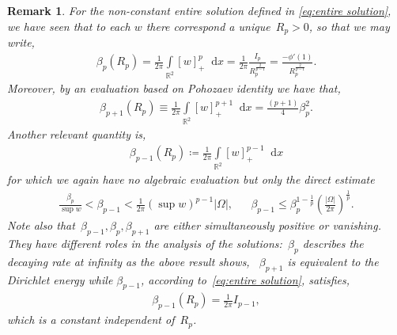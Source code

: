 \documentclass[10pt]{amsart}
\newcommand{\parenthesis}[1]{\left(#1\right)} %
\newcommand{\R}{\mathbb{R}}
\newcommand{\dd}{\mathop{}\!\mathrm{d}}
\def\R{\mathbb{R}}
\newtheorem{remark}[theorem]{Remark}
\begin{document}
\bigskip

    \begin{remark}
        For the non-constant entire solution defined in \eqref{eq:entire solution}, we have seen that to each $w$ there correspond a
        unique~$R_p>0$, so that we may write,
        \begin{align*}
            \beta_p(R_p)= \frac{1}{2\pi}\int\limits_{\R^2} [w]_+^p\dd{x}
            =\frac{1}{2\pi} \frac{I_p}{R_p^{\frac{2}{p-1}}}=\frac{-\phi'(1)}{R_p^{\frac{2}{p-1}}}.
        \end{align*}
        Moreover, by an evaluation based on Pohozaev identity we have that,
        \begin{align*}
            \beta_{p+1}(R_p)\equiv \frac{1}{2\pi}\int\limits_{\R^2} [w]_+^{p+1}\dd{x}
            =\frac{(p+1)}{4}\beta_p^2.
        \end{align*}
        Another relevant quantity is,
        \begin{align*}
           \beta_{p-1}(R_p)\coloneqq \frac{1}{2\pi}\int\limits_{\R^2} [w]_+^{p-1}\dd{x}
        \end{align*}
        for which we again have no algebraic evaluation but only the direct estimate
        \begin{align*}
            \frac{\beta_p}{\sup w}<\beta_{p-1} < \frac{1}{2\pi}(\sup w)^{p-1}|\Omega|, & &
           \beta_{p-1}\leq \beta_p^{1-\frac{1}{p}} \parenthesis{\frac{|\Omega|}{2\pi}}^{\frac{1}{p}}.
        \end{align*}
        Note also that~$\beta_{p-1}, \beta_p, \beta_{p+1}$ are either simultaneously positive or vanishing.
        They have different roles in the analysis of the solutions:~$\beta_p$ describes the decaying rate at infinity as
        the above result shows, ~$\beta_{p+1}$ is equivalent to the Dirichlet energy while $\beta_{p-1}$, according to~\eqref{eq:entire solution},
        satisfies,
        \begin{align}\label{bquant}
           \beta_{p-1}(R_p)=\frac{1}{2\pi}I_{p-1},
        \end{align}
        which is a constant independent of~$R_p$.
    \end{remark}

\end{document}
